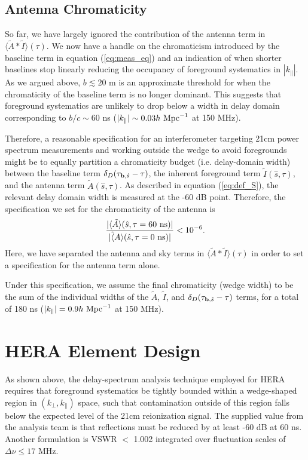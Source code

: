 \documentclass[11pt]{article}
\newcommand{\bvec}{{\bf b}}
\newcommand{\shat}{{\hat s}}
\newcommand{\kpr}{{k_\perp}}
\newcommand{\kpl}{{k_\parallel}}
\newcommand{\AI}{{\langle\tilde A*\tilde I\rangle}}
\newcommand{\AItau}{{\AI(\tau)}}
\newcommand{\hMpci}{{h~{\rm Mpc}^{-1}}}
\begin{document}
\subsection{Antenna Chromaticity}

So far, we have largely ignored the contribution of the antenna term in $\AItau$.  We now have
a handle on the chromaticism introduced by the baseline term in equation (\ref{eq:meas_eq}) and 
an indication of when shorter baselines stop linearly reducing the occupancy of
foreground systematics in $|\kpl|$.  As we argued above, $b\lesssim20$ m is an approximate threshold
for when the chromaticity of the baseline term is no longer dominant.  This suggests that
foreground systematics are unlikely to drop below a width in delay domain corresponding to 
$b/c\sim60$ ns ($|\kpl|\sim0.03\hMpci$ at 150 MHz).

Therefore, a reasonable specification 
for an interferometer targeting 21cm power spectrum measurements and working outside
the wedge to avoid foregrounds might be to equally partition a chromaticity budget (i.e. delay-domain
width) between the baseline term $\delta_D(\tau_{\bvec,\shat}-\tau)$, 
the inherent foreground term $\tilde I(\shat,\tau)$, and the antenna term $\tilde A(\shat,\tau)$.
As described in equation (\ref{eq:def_S}), the relevant delay domain width 
is measured at the -60 dB point.  Therefore, the specification we set for the chromaticity
of the antenna is
\begin{equation}
\frac{|\langle\tilde A\rangle(\shat,\tau=60~{\rm ns})|}{|\tilde \langle A\rangle(\shat,\tau=0~{\rm ns})|}<10^{-6}.
\label{eq:A_req}
\end{equation}
Here, we have separated the antenna and sky terms in $\AItau$ in order to set a specification for
the antenna term alone.

Under this specification, we assume the final chromaticity (wedge width) to be the sum of the
individual widths of the $\tilde A$, $\tilde I$, and $\delta_D(\tau_{\bvec,\shat}-\tau)$ terms,
for a total of 180 ns ($|\kpl|=0.9\hMpci$ at 150 MHz).

\section{HERA Element Design}

As shown above, the delay-spectrum analysis technique employed for HERA requires that foreground
systematics be tightly bounded within a wedge-shaped region in $(\kpr,\kpl)$ space,
such that contamination outside of this region falls
below the expected level of the 21cm reionization signal.
The supplied value from the analysis team is that reflections must be reduced
by at least -60 dB at 60 ns.  Another formulation is VSWR $<$ 1.002 integrated over fluctuation scales of $\Delta\nu\leq17$ MHz.
\end{document}
